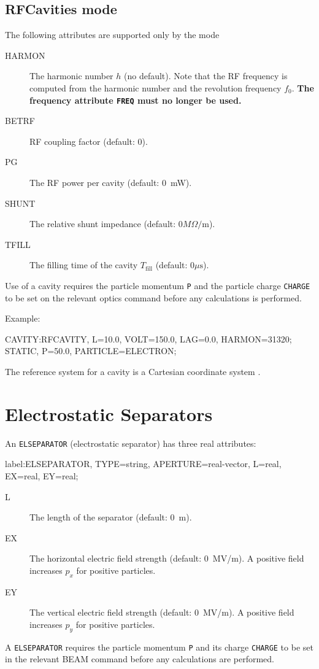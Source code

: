 \subsection{RFCavities \opalmap mode}
The following attributes are supported only by the \opalmap mode
\begin{description}
\item[HARMON]
  The harmonic number $h$ (no default).
  Note that the RF frequency is computed from the harmonic number
  and the revolution frequency $f_0$.
  \textbf{The frequency attribute \texttt{FREQ} must no longer be used.}
\item[BETRF]
  RF coupling factor (default: 0).
\item[PG]
  The RF power per cavity (default: 0~mW).
\item[SHUNT]
  The relative shunt impedance (default: $0 M\Omega/\mathrm{m}$).
\item[TFILL]
  The filling time of the cavity $T_\mathrm{fill}$
  (default: $0 \mu\mathrm{s}$).
\end{description}
Use of a cavity requires the particle momentum \texttt{P}
and the particle charge \texttt{CHARGE} to be set on the relevant
optics command before any calculations is performed.

\noindent Example:
\begin{example}
CAVITY:RFCAVITY, L=10.0, VOLT=150.0, LAG=0.0,
       HARMON=31320;
STATIC, P=50.0, PARTICLE=ELECTRON;
\end{example}
The reference system for a cavity is a
Cartesian coordinate system .


\section{Electrostatic Separators}
\label{sec:separator}
An \texttt{ELSEPARATOR} (electrostatic separator) has three real
attributes:
\begin{example}
label:ELSEPARATOR, TYPE=string, APERTURE=real-vector,
      L=real, EX=real, EY=real;
\end{example}
\begin{description}
\item[L]
  The length of the separator (default: 0~m).
\item[EX]
  The horizontal electric field strength (default: 0~MV/m).
  A positive field increases $p_x$ for positive particles.
\item[EY]
  The vertical electric field strength (default: 0~MV/m).
  A positive field increases $p_y$ for positive particles.
\end{description}
A \texttt{ELSEPARATOR} requires the particle momentum \texttt{P}
and its charge \texttt{CHARGE} to be set in the relevant
{BEAM} command  before any calculations are performed.

